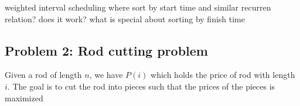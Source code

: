 \documentclass[11pt]{article}
\begin{document}
\begin{solution}
\begin{enumerate}
      \begin{algorithm}[H]
       \end{algorithm}
  \end{enumerate}
\end{solution}

weighted interval scheduling where sort by start time and similar recurren relation? does it work? what is special about sorting by finish time


\subsection*{Problem 2: Rod cutting problem}

Given a rod of length $n$, we have $P(i)$ which holds the price of rod with length $i$. The goal is to cut the rod into pieces such that the prices of the pieces is maximized
\end{document}

